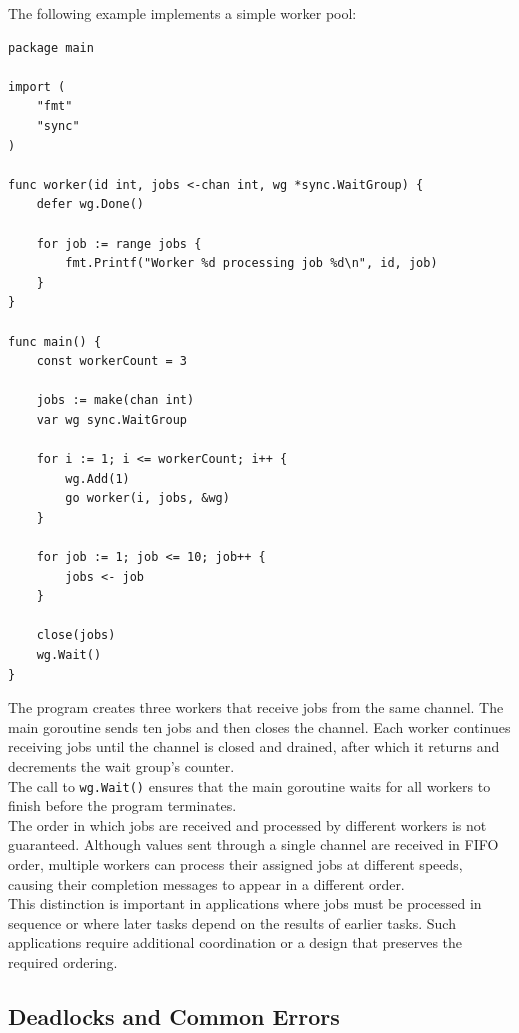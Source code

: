 The following example implements a simple worker pool:

\begin{lstlisting}
package main

import (
    "fmt"
    "sync"
)

func worker(id int, jobs <-chan int, wg *sync.WaitGroup) {
    defer wg.Done()

    for job := range jobs {
        fmt.Printf("Worker %d processing job %d\n", id, job)
    }
}

func main() {
    const workerCount = 3

    jobs := make(chan int)
    var wg sync.WaitGroup

    for i := 1; i <= workerCount; i++ {
        wg.Add(1)
        go worker(i, jobs, &wg)
    }

    for job := 1; job <= 10; job++ {
        jobs <- job
    }

    close(jobs)
    wg.Wait()
}
\end{lstlisting}

The program creates three workers that receive jobs from the same channel. The main goroutine sends ten jobs and then closes the channel. Each worker continues receiving jobs until the channel is closed and drained, after which it returns and decrements the wait group's counter.\\

The call to \texttt{wg.Wait()} ensures that the main goroutine waits for all workers to finish before the program terminates.\\

The order in which jobs are received and processed by different workers is not guaranteed. Although values sent through a single channel are received in FIFO order, multiple workers can process their assigned jobs at different speeds, causing their completion messages to appear in a different order.\\

This distinction is important in applications where jobs must be processed in sequence or where later tasks depend on the results of earlier tasks. Such applications require additional coordination or a design that preserves the required ordering.\\

\subsection{Deadlocks and Common Errors}

